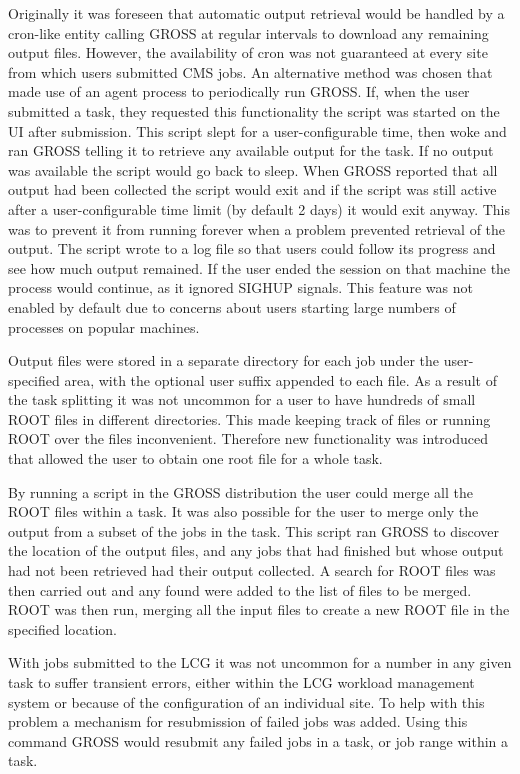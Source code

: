 Originally it was foreseen that automatic output retrieval would be handled by a cron-like entity calling GROSS at regular intervals to download any remaining output files. However, the availability of cron was not guaranteed at every site from which users submitted CMS jobs. An alternative method was chosen that made use of an agent process to periodically run GROSS. If, when the user submitted a task, they requested this functionality the script was started on the UI after submission. This script slept for a user-configurable time, then woke and ran GROSS telling it to retrieve any available output for the task. If no output was available the script would go back to sleep. When GROSS reported that all output had been collected the script would exit and if the script was still active after a user-configurable time limit (by default 2 days) it would exit anyway. This was to prevent it from running forever when a problem prevented retrieval of the output. The script wrote to a log file so that users could follow its progress and see how much output remained. If the user ended the session on that machine the process would continue, as it ignored SIGHUP signals. This feature was not enabled by default due to concerns about users starting large numbers of processes on popular machines. 

Output files were stored in a separate directory for each job under the user-specified area, with the optional user suffix appended to each file. As a result of the task splitting it was not uncommon for a user to have hundreds of small ROOT files in different directories. This made keeping track of files or running ROOT over the files inconvenient. Therefore new functionality was introduced that allowed the user to obtain one root file for a whole task. 

By running a script in the GROSS distribution the user could merge all the ROOT files within a task. It was also possible for the user to merge only the output from a subset of the jobs in the task. This script ran GROSS to discover the location of the output files, and any jobs that had finished but whose output had not been retrieved had their output collected. A search for ROOT files was then carried out and any found were added to the list of files to be merged. ROOT was then run, merging all the input files to create a new ROOT file in the specified location.

With jobs submitted to the LCG it was not uncommon for a number in any given task to suffer transient errors, either within the LCG workload management system or because of the configuration of an individual site. To help with this problem a mechanism for resubmission of failed jobs was added. Using this command GROSS would resubmit any failed jobs in a task, or job range within a task. 

